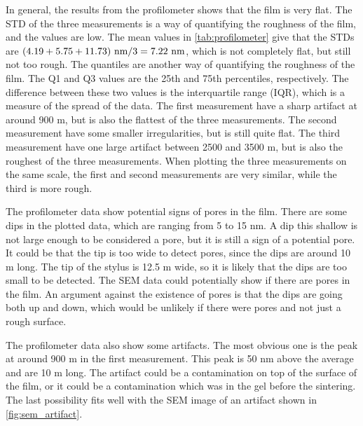 \noindent In general, the results from the profilometer shows that the film is very flat.
The STD of the three measurements is a way of quantifying the roughness of the film, and the values are low.
The mean values in \autoref{tab:profilometer} give that the STDs are $(4.19 + 5.75 + 11.73) \textnormal{ nm} / 3  = 7.22 \textnormal{ nm}$, which is not completely flat, but still not too rough. %
The quantiles are another way of quantifying the roughness of the film.
The Q1 and Q3 values are the 25th and 75th percentiles, respectively.
The difference between these two values is the interquartile range (IQR), which is a measure of the spread of the data.
The first measurement have a sharp artifact at around 900 \textmu m, but is also the flattest of the three measurements.
The second measurement have some smaller irregularities, but is still quite flat.
The third measurement have one large artifact between 2500 and 3500 \textmu m, but is also the roughest of the three measurements.
When plotting the three measurements on the same scale, the first and second measurements are very similar, while the third is more rough.

The profilometer data show potential signs of pores in the film.
There are some dips in the plotted data, which are ranging from 5 to 15 nm.
A dip this shallow is not large enough to be considered a pore, but it is still a sign of a potential pore.
It could be that the tip is too wide to detect pores, since the dips are around 10 \textmu m long.
The tip of the stylus is 12.5 \textmu m wide, so it is likely that the dips are too small to be detected.
The SEM data could potentially show if there are pores in the film.
An argument against the existence of pores is that the dips are going both up and down, which would be unlikely if there were pores and not just a rough surface. %

The profilometer data also show some artifacts.
The most obvious one is the peak at around 900 \textmu m in the first measurement.
This peak is 50 nm above the average and are 10 \textmu m long.
The artifact could be a contamination on top of the surface of the film, or it could be a contamination which was in the gel before the sintering.
The last possibility fits well with the SEM image of an artifact shown in \autoref{fig:sem_artifact}.

